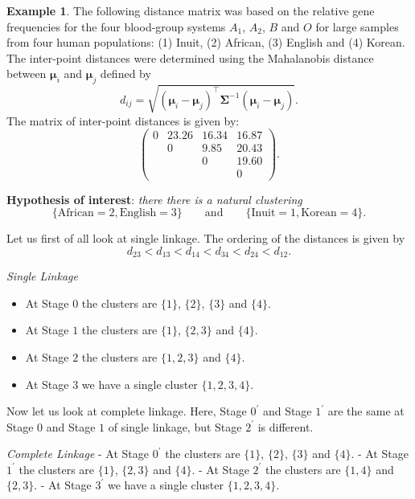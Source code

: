 \documentclass[]{book}
\providecommand{\tightlist}{%
  \setlength{\itemsep}{0pt}\setlength{\parskip}{0pt}}
\theoremstyle{definition}
\theoremstyle{definition}
\newtheorem{example}{Example}[chapter]
\theoremstyle{definition}
\theoremstyle{remark}
\begin{document}
\begin{example}
\protect\hypertarget{exm:exten1}{}{\label{exm:exten1} }The following distance matrix was based on the relative gene frequencies for the four blood-group systems \(A_1\), \(A_2\), \(B\) and \(O\) for large samples from four human populations: (1) Inuit, (2) African, (3) English and (4) Korean. The inter-point distances were determined using the Mahalanobis distance between \(\boldsymbol \mu_i\) and \(\boldsymbol \mu_j\) defined by
\[
d_{ij}=\sqrt{(\boldsymbol \mu_i -\boldsymbol \mu_j)^\top \boldsymbol \Sigma^{-1}(\boldsymbol \mu_i - \boldsymbol \mu_j)}.
\]
The matrix of inter-point distances is given by:
\[
\begin{pmatrix}
0&23.26&16.34 & 16.87\\
&0&9.85 & 20.43 \\
&&0&19.60\\
&&&0
\end{pmatrix}.
\]

\textbf{Hypothesis of interest}: \emph{there there is a natural clustering}
\[
\{\text{African}=2, \text{English}=3\}\qquad \text{and}\qquad
\{\text{Inuit}=1, \text{Korean}=4\}.
\]

Let us first of all look at single linkage. The ordering of the distances is given by
\[
d_{23} < d_{13} <d_{14}<d_{34}<d_{24}<d_{12}.
\]

\emph{Single Linkage}

\begin{itemize}
\tightlist
\item
  At Stage \(0\) the clusters are \(\{1\}\), \(\{2\}\), \(\{3\}\) and \(\{4\}\).
\item
  At Stage \(1\) the clusters are \(\{1\}\), \(\{2,3\}\) and \(\{4\}\).
\item
  At Stage \(2\) the clusters are \(\{1,2,3\}\) and \(\{4\}\).
\item
  At Stage \(3\) we have a single cluster \(\{1,2,3,4\}\).
\end{itemize}

Now let us look at complete linkage. Here, Stage \(0^\prime\) and Stage \(1^\prime\) are the same at Stage \(0\) and Stage \(1\) of single linkage, but Stage \(2^\prime\) is different.

\emph{Complete Linkage}
- At Stage \(0^\prime\) the clusters are \(\{1\}\), \(\{2\}\), \(\{3\}\) and \(\{4\}\).
- At Stage \(1^\prime\) the clusters are \(\{1\}\), \(\{2,3\}\) and \(\{4\}\).
- At Stage \(2^\prime\) the clusters are \(\{1,4\}\) and \(\{2,3\}\).
- At Stage \(3^\prime\) we have a single cluster \(\{1,2,3,4\}\).


\end{example}
\end{document}
